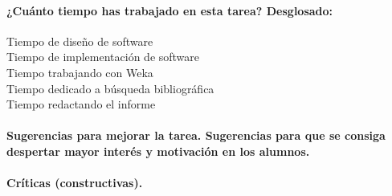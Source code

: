 \documentclass[11pt, titlepage,a4paper]{article}
\begin{document}
\paragraph{¿Cuánto tiempo has trabajado en esta tarea? Desglosado:\\}
\begin{description}
	\item[Tiempo de diseño de software]
	\item[Tiempo de implementación de software]
	\item[Tiempo trabajando con Weka]
	\item[Tiempo dedicado a búsqueda bibliográfica]
	\item[Tiempo redactando el informe]
\end{description}

\paragraph{Sugerencias para mejorar la tarea. Sugerencias para que se consiga despertar mayor
interés y motivación en los alumnos.\\}

\paragraph{ Críticas (constructivas).\\}
\end{document}
